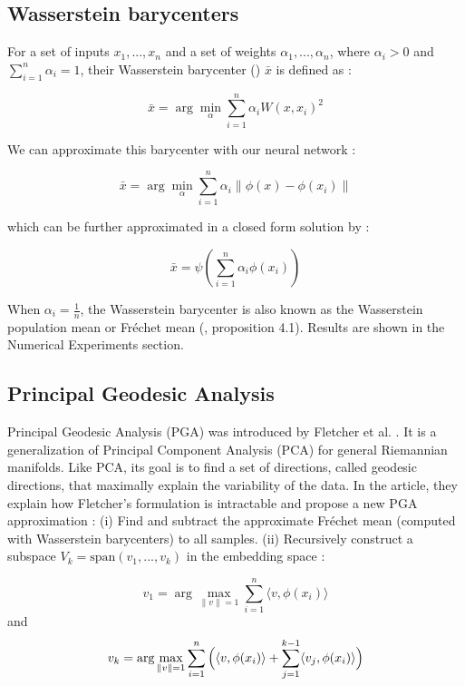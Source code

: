 \documentclass{article}
\begin{document}
\subsection{Wasserstein barycenters}

For a set of inputs $x_1, ..., x_n$ and a set of weights $\alpha_1, ..., \alpha_n$, where $\alpha_i > 0$ and $\sum_{i=1}^{n} \alpha_i = 1$, their Wasserstein barycenter (\cite{agueh2011barycenters}) $\bar{x}$ is defined as :

$$
\bar{x} = \arg \min_{\alpha} \sum_{i=1}^{n} \alpha_i W(x, x_i)^2
$$

We can approximate this barycenter with our neural network :

$$
\bar{x} = \arg \min_{\alpha} \sum_{i=1}^{n} \alpha_i \| \phi(x) - \phi(x_i) \|
$$

which can be further approximated in a closed form solution by :

\begin{equation}
\bar{x} = \psi(\sum_{i=1}^{n} \alpha_i \phi(x_i))
\label{bary}
\end{equation}

When $\alpha_i = \frac{1}{n}$, the Wasserstein barycenter is also known as the Wasserstein population mean or Fréchet mean (\cite{bigot2017geodesic}, proposition 4.1). Results are shown in the Numerical Experiments section.

\subsection{Principal Geodesic Analysis}

Principal Geodesic Analysis (PGA) was introduced by Fletcher et al. \cite{fletcher2004principal}. It is a generalization of Principal Component Analysis (PCA) for general Riemannian manifolds. Like PCA, its goal is to find a set of directions, called geodesic directions, that maximally explain the variability of the data. In the article, they explain how Fletcher's formulation is intractable and propose a new PGA approximation : (i) Find and subtract the approximate Fréchet mean (computed with Wasserstein barycenters) to all samples. (ii) Recursively construct a subspace $V_k = \text{span}(v_1, ..., v_k)$ in the embedding space :

$$
v_1 = \arg \max_{\|v\| = 1} \sum_{i=1}^{n} \langle v, \phi(x_i) \rangle
$$
and
$$
v_k = \arg \max_{\|v\| = 1} \sum_{i=1}^{n} \Big{(} \langle v, \phi(x_i) \rangle + \sum_{j=1}^{k-1} \langle v_j, \phi(x_i) \rangle \Big{)}
$$
\end{document}
